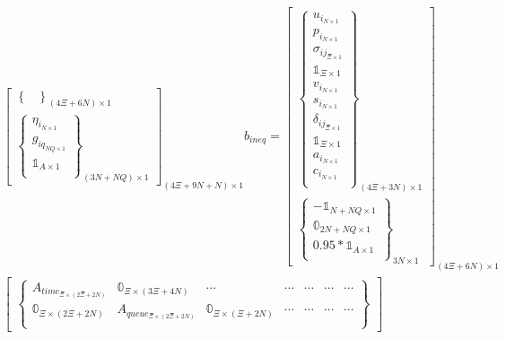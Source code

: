 \documentclass[conference]{IEEEtran}
\begin{document}
\begin{equation}
\begin{array}{c}
\begin{bmatrix}
\begin{Bmatrix}
        \end{Bmatrix}_{(4\Xi + 6N) \times 1} \\
        \begin{Bmatrix}
            \eta_{i_{N \times 1}} \\
            g_{iq_{NQ \times 1}} \\
            \mathbb{1}_{A \times 1} \\
        \end{Bmatrix}_{(3N + NQ) \times 1}
    \end{bmatrix}_{(4\Xi + 9N + N) \times 1}
    b_{ineq} =
    \begin{bmatrix}
        \begin{Bmatrix}
            u_{i_{N \times 1}} \\ p_{i_{N \times 1}} \\ \sigma_{ij_{\Xi \times 1}} \\ \mathbb{1}_{\Xi \times 1} \\ v_{i_{N \times 1}} \\ s_{i_{N \times 1}} \\ \delta_{ij_{\Xi \times 1}} \\ \mathbb{1}_{\Xi \times 1} \\ a_{i_{N \times 1}} \\ c_{i_{N \times 1}} \\
        \end{Bmatrix}_{(4\Xi + 3N) \times 1} \\
        \begin{Bmatrix}
            -\mathbb{1}_{N + NQ \times 1} \\
            \mathbb{0}_{2N + NQ \times 1} \\
            0.95*\mathbb{1}_{A \times 1} \\
        \end{Bmatrix}_{3N \times 1}
    \end{bmatrix}_{(4\Xi + 6N) \times 1} \\
    \begin{bmatrix}
        \begin{Bmatrix}
            A_{time_{\Xi \times (2\Xi + 2N)}}   & \mathbb{0}_{\Xi \times (3\Xi + 4N)} & \cdots                              & \cdots                       & \cdots                            & \cdots              & \cdots \\
            \mathbb{0}_{\Xi \times (2\Xi + 2N)} & A_{queue_{\Xi \times (2\Xi + 2N)}}  & \mathbb{0}_{\Xi \times (\Xi + 2N)}  & \cdots                       & \cdots                            & \cdots              & \cdots \\

\end{Bmatrix}
\end{bmatrix}
\end{array}
\end{equation}
\end{document}
